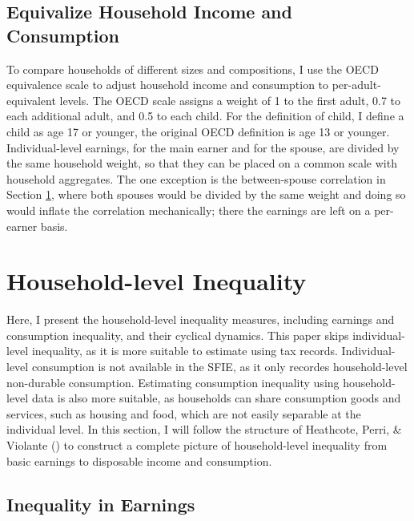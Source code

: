 \documentclass{article}
\begin{document}
\subsection{Equivalize Household Income and Consumption}

To compare households of different sizes and compositions, I use the OECD equivalence scale to adjust household income and consumption to per-adult-equivalent levels. The OECD scale assigns a weight of 1 to the first adult, 0.7 to each additional adult, and 0.5 to each child. For the definition of child, I define a child as age 17 or younger, the original OECD definition is age 13 or younger. Individual-level earnings, for the main earner and for the spouse, are divided by the same household weight, so that they can be placed on a common scale with household aggregates. The one exception is the between-spouse correlation in Section \ref{sec:household_inequality}, where both spouses would be divided by the same weight and doing so would inflate the correlation mechanically; there the earnings are left on a per-earner basis.

\section{Household-level Inequality}
\label{sec:household_inequality}

Here, I present the household-level inequality measures, including earnings and consumption inequality, and their cyclical dynamics. This paper skips individual-level inequality, as it is more suitable to estimate using tax records. Individual-level consumption is not available in the SFIE, as it only recordes household-level non-durable consumption.
Estimating consumption inequality using household-level data is also more suitable, as households can share consumption goods and services, such as housing and food, which are not easily separable at the individual level.
In this section, I will follow the structure of Heathcote, Perri, \& Violante (\citeyear{HEATHCOTE_2010}) to construct a complete picture of household-level inequality from basic earnings to disposable income and consumption. 


\subsection{Inequality in Earnings}
\end{document}
